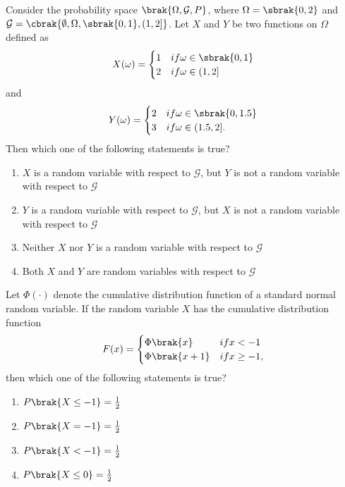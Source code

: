 \iffalse
\chapter{2023}
\author{AI24BTECH11030}
\section{st}
\fi


\item Consider the probability space $ \brak{\Omega, \mathcal{G}, P}$, where $ \Omega = \sbrak{0, 2}$ and $\mathcal{G} = \cbrak{ \emptyset, \Omega, \sbrak{0, 1}, (1, 2]}$. Let $X$ and $Y$ be two functions on $\Omega$ defined as 
\begin{align*}
    X(\omega) = \begin{cases} 
      1 & if \omega \in \sbrak{0, 1} \\ 
      2 & if \omega \in (1, 2] 
   \end{cases}
\end{align*}
and 
\begin{align*}
    Y(\omega) = \begin{cases} 
      2 & if \omega \in \sbrak{0, 1.5} \\ 
      3 & if \omega \in (1.5, 2]. 
   \end{cases}
\end{align*}
Then which one of the following statements is true?
\begin{enumerate}
    \item $X$ is a random variable with respect to $ \mathcal{G}$, but $Y$ is not a random variable with respect to $ \mathcal{G}$
    \item $Y$ is a random variable with respect to $ \mathcal{G} $, but $X$ is not a random variable with respect to $ \mathcal{G}$
    \item Neither $X$ nor $Y$ is a random variable with respect to $ \mathcal{G} $
    \item Both $X$ and $Y$ are random variables with respect to $\mathcal{G} $
\end{enumerate}

\item Let $ \Phi(\cdot) $ denote the cumulative distribution function of a standard normal random variable. If the random variable $X$ has the cumulative distribution function 
\begin{align*}
F(x) = \begin{cases} 
      \Phi\brak{x} & if x < -1 \\ 
      \Phi\brak{x + 1} & if x \geq -1, 
   \end{cases}
\end{align*}
then which one of the following statements is true?
\begin{enumerate}
    \item $ P\brak{X \leq -1} = \frac{1}{2} $
    \item $ P\brak{X = -1} = \frac{1}{2} $
    \item $ P\brak{X < -1} = \frac{1}{2} $
    \item $ P\brak{X \leq 0} = \frac{1}{2} $
\end{enumerate}

